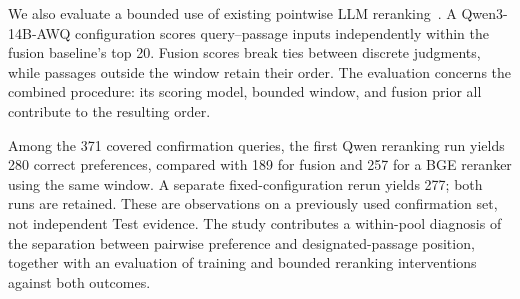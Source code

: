 We also evaluate a bounded use of existing pointwise LLM reranking~\cite{zhuang-etal-2024-beyond}. A Qwen3-14B-AWQ configuration scores query--passage inputs independently within the fusion baseline's top 20. Fusion scores break ties between discrete judgments, while passages outside the window retain their order. The evaluation concerns the combined procedure: its scoring model, bounded window, and fusion prior all contribute to the resulting order.

Among the 371 covered confirmation queries, the first Qwen reranking run yields 280 correct preferences, compared with 189 for fusion and 257 for a BGE reranker using the same window. A separate fixed-configuration rerun yields 277; both runs are retained. These are observations on a previously used confirmation set, not independent Test evidence. The study contributes a within-pool diagnosis of the separation between pairwise preference and designated-passage position, together with an evaluation of training and bounded reranking interventions against both outcomes.
